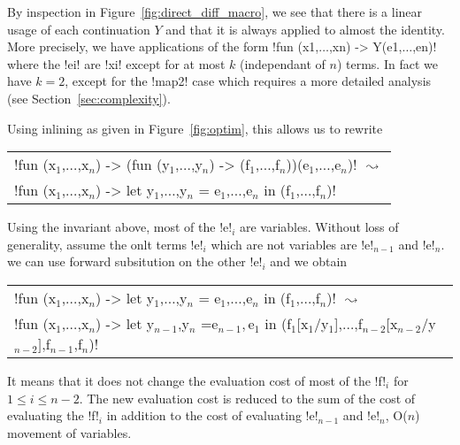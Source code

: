 By inspection in Figure~\ref{fig:direct_diff_macro}, 
we see that there is a linear usage of  each continuation $Y$ 
and that it is always applied to almost the identity. 
More precisely, we have applications of the form !fun (x1,$\ldots$,xn) -> Y(e1,$\ldots$,en)! 
where the !ei! are !xi! except for at most $k$ (independant of $n$) terms.
In fact we have $k=2$, except for the !map2! case which requires a more detailed analysis (see Section~\ref{sec:complexity}).

Using inlining as given in Figure~\ref{fig:optim}, this allows us to rewrite

\begin{tabular}{l}
!fun (x$_{1}$,$\ldots$,x$_n$) -> (fun (y$_{1}$,$\ldots$,y$_n$) -> (f$_{1}$,$\ldots$,f$_n$))(e$_{1}$,$\ldots$,e$_n$)! 
$\text{ $\leadsto$ }$ \\
!fun (x$_{1}$,$\ldots$,x$_n$) -> let y$_{1}$,$\ldots$,y$_n$ = e$_1$,$\ldots$,e$_n$ in (f$_{1}$,$\ldots$,f$_n$)!
\end{tabular}

Using the invariant above, most of the !e!$_{i}$ are variables. 
Without loss of generality, assume the onlt terms !e!$_{i}$ which are not variables are !e!$_{n-1}$ and !e!$_{n}$.
we can use forward subsitution on the other !e!$_{i}$ and we obtain

\begin{tabular}{l}
    !fun (x$_{1}$,$\ldots$,x$_n$) -> let y$_{1}$,$\ldots$,y$_n$ = e$_1$,$\ldots$,e$_n$ in (f$_{1}$,$\ldots$,f$_n$)!  $\text{ $\leadsto$ }$ \\
    !fun (x$_{1}$,$\ldots$,x$_n$) -> let y$_{n-1}$,y$_n$ =e$_{n-1},$e$_1$ in (f$_{1}$[x$_{1}$/y$_{1}$],$\ldots$,f$_{n-2}[$x$_{n-2}$/y$_{n-2}]$,f$_{n-1}$,f$_{n}$)!
\end{tabular}
It means that it does not change the evaluation cost of most of the !f!$_{i}$ for $1\leq i \leq n-2$.
The new evaluation cost is reduced to the sum of the cost of evaluating 
the !f!$_{i}$ in addition to the cost of evaluating !e!$_{n-1}$ and !e!$_{n}$, O($n$) movement of variables.

